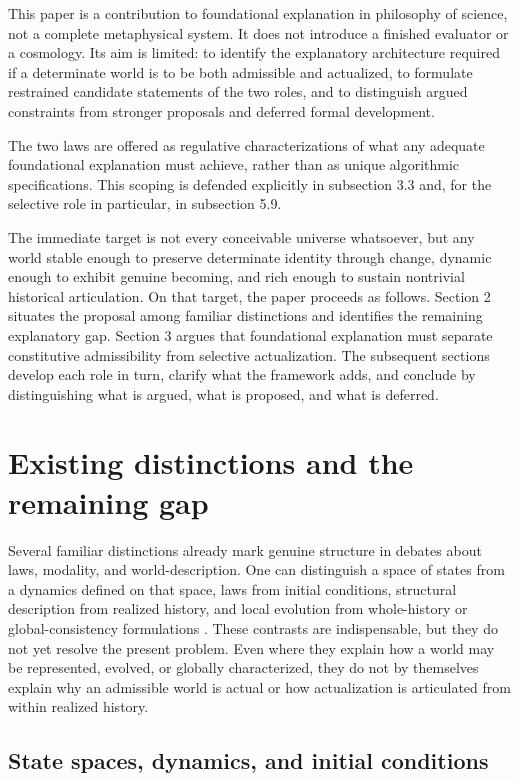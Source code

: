 \documentclass[11pt]{article}
\theoremstyle{foundation}
\begin{document}
This paper is a contribution to foundational explanation in philosophy of science, not a complete metaphysical system. It does not introduce a finished evaluator or a cosmology. Its aim is limited: to identify the explanatory architecture required if a determinate world is to be both admissible and actualized, to formulate restrained candidate statements of the two roles, and to distinguish argued constraints from stronger proposals and deferred formal development.

The two laws are offered as regulative characterizations of what any adequate foundational explanation must achieve, rather than as unique algorithmic specifications. This scoping is defended explicitly in subsection 3.3 and, for the selective role in particular, in subsection 5.9.

The immediate target is not every conceivable universe whatsoever, but any world stable enough to preserve determinate identity through change, dynamic enough to exhibit genuine becoming, and rich enough to sustain nontrivial historical articulation. On that target, the paper proceeds as follows. Section 2 situates the proposal among familiar distinctions and identifies the remaining explanatory gap. Section 3 argues that foundational explanation must separate constitutive admissibility from selective actualization. The subsequent sections develop each role in turn, clarify what the framework adds, and conclude by distinguishing what is argued, what is proposed, and what is deferred.

\section{Existing distinctions and the remaining gap}

Several familiar distinctions already mark genuine structure in debates about laws, modality, and world-description. One can distinguish a space of states from a dynamics defined on that space, laws from initial conditions, structural description from realized history, and local evolution from whole-history or global-consistency formulations \citep{Cartwright1983,vanFraassen1989,Maudlin2007,Price1996}. These contrasts are indispensable, but they do not yet resolve the present problem. Even where they explain how a world may be represented, evolved, or globally characterized, they do not by themselves explain why an admissible world is actual or how actualization is articulated from within realized history.

\subsection{State spaces, dynamics, and initial conditions}
\end{document}
